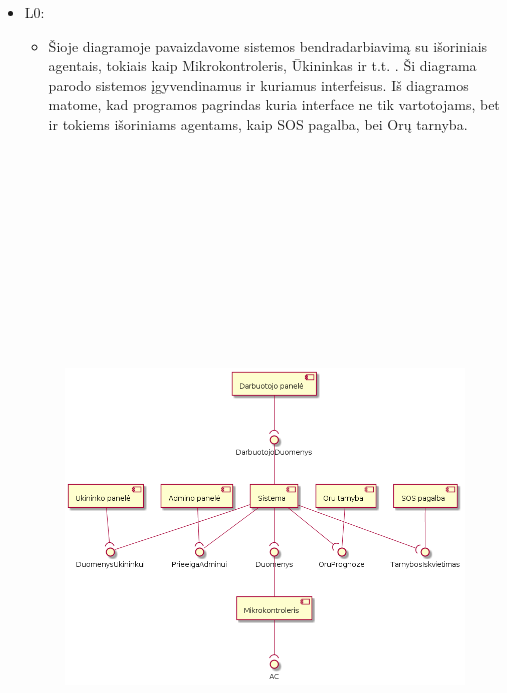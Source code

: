 \documentclass[oneside]{VUMIFPSkursinis}
\begin{document}
	\begin{itemize}
	\item L0:
	\begin{itemize}
	\item Šioje diagramoje pavaizdavome sistemos bendradarbiavimą su išoriniais agentais, tokiais kaip Mikrokontroleris, Ūkininkas ir t.t. . Ši diagrama parodo sistemos įgyvendinamus ir kuriamus interfeisus. Iš diagramos matome, kad programos pagrindas kuria interface ne tik vartotojams, bet ir tokiems išoriniams agentams, kaip SOS pagalba, bei Orų tarnyba.
\end{itemize}
	\begin{figure}[H]
		\centering	
	\includegraphics[width=17cm,height=20cm,keepaspectratio]{L1V2.png}
	\caption{}
	\label{fig:L1V2}


\end{figure}
\end{itemize}
\end{document}
